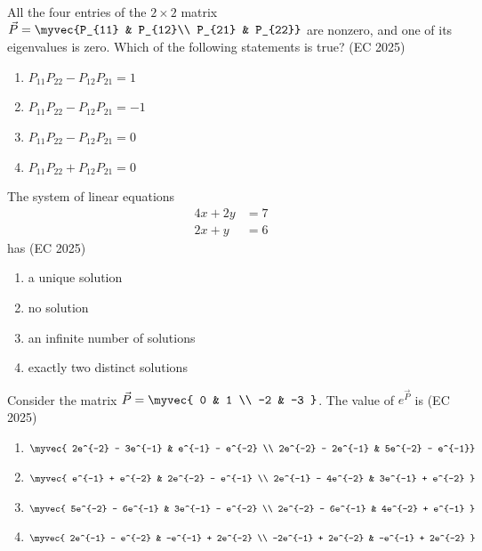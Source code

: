 \item All the four entries of the $2\times2$ matrix $\vec{P} = \myvec{P_{11} & P_{12}\\ P_{21} & P_{22}}$ are nonzero, and one of its eigenvalues is zero. Which of the following statements is true?
\hfill (EC 2025)
\begin{multicols}{2}
    \begin{enumerate}
        \item $P_{11}P_{22} - P_{12}P_{21} = 1$
        \item $P_{11}P_{22} - P_{12}P_{21} = -1$
        \item $P_{11}P_{22} - P_{12}P_{21} = 0$
        \item $P_{11}P_{22} + P_{12}P_{21} = 0$
    \end{enumerate}
\end{multicols}
%
\item The system of linear equations
\begin{align*}
4x + 2y &= 7 \\
2x + y  &= 6
\end{align*}
has
\hfill (EC 2025)
\begin{multicols}{2}
    \begin{enumerate}
        \item a unique solution
        \item no solution
        \item an infinite number of solutions
        \item exactly two distinct solutions
    \end{enumerate}
\end{multicols}
\item Consider the matrix $\vec{P} = \myvec { 0 & 1 \\ -2 & -3 }$. The value of $e^{\vec{P}}$ is
\hfill (EC 2025)
\begin{multicols}{2}
\begin{enumerate}
    \item $\myvec { 2e^{-2} - 3e^{-1} & e^{-1} - e^{-2} \\ 2e^{-2} - 2e^{-1} & 5e^{-2} - e^{-1}}$
    \item $\myvec { e^{-1} + e^{-2} & 2e^{-2} - e^{-1} \\ 2e^{-1} - 4e^{-2} & 3e^{-1} + e^{-2} }$
    \item $\myvec { 5e^{-2} - 6e^{-1} & 3e^{-1} - e^{-2} \\ 2e^{-2} - 6e^{-1} & 4e^{-2} + e^{-1} }$
    \item $\myvec { 2e^{-1} - e^{-2} & -e^{-1} + 2e^{-2} \\ -2e^{-1} + 2e^{-2} & -e^{-1} + 2e^{-2} }$
\end{enumerate}
\end{multicols}
